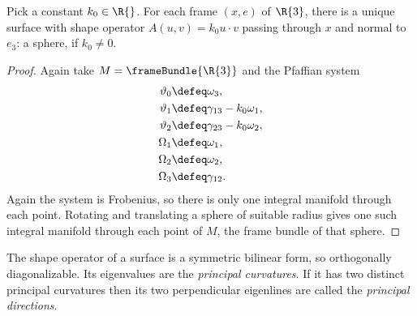 \begin{lemma}\label{lemma:sphere.unique}
Pick a constant \(k_0 \in \R{}\).
For each frame \((x,e)\) of \(\R{3}\), there is a unique surface with shape operator \(A(u,v)=k_0 u \cdot v\) passing through \(x\) and normal to \(e_3\): a sphere, if \(k_0 \ne 0\).
\end{lemma}
\begin{proof}
Again take \(M=\frameBundle{\R{3}}\) and the Pfaffian system
\begin{align*}
\vartheta_0 &\defeq \omega_3, \\
\vartheta_1 &\defeq \gamma_{13} - k_0 \omega_1, \\
\vartheta_2 &\defeq \gamma_{23} - k_0 \omega_2, \\
\Omega_1 &\defeq \omega_1, \\
\Omega_2 &\defeq \omega_2, \\
\Omega_3 &\defeq \gamma_{12}.
\end{align*}
Again the system is Frobenius, so there is only one integral manifold through each point.
Rotating and translating a sphere of suitable radius gives one such integral manifold through each point of \(M\), the frame bundle of that sphere.
\end{proof}


The shape operator of a surface is a symmetric bilinear form, so orthogonally diagonalizable.
Its eigenvalues are the \emph{principal curvatures}.
If it has two distinct principal curvatures then its two perpendicular eigenlines are called the \emph{principal directions}.


